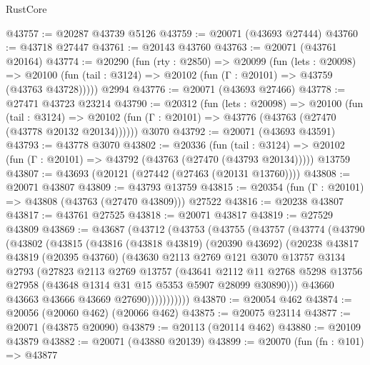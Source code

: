 \begin{lexlean}{RustCore}
\begin{coremodule}
@43757 := @20287 @43739 @5126
@43759 := @20071 (@43693 @27444)
@43760 := @43718 @27447
@43761 := @20143 @43760
@43763 := @20071 (@43761 @20164)
@43774 := @20290
    (fun (rty : @2850) =>
    @20099
      (fun (lets : @20098) =>
      @20100 (fun (tail : @3124) => @20102 (fun (Γ : @20101) => @43759 (@43763 @43728)))))
    @2994
@43776 := @20071 (@43693 @27466)
@43778 := @27471 @43723 @23214
@43790 := @20312
    (fun (lets : @20098) =>
    @20100
      (fun (tail : @3124) =>
      @20102 (fun (Γ : @20101) => @43776 (@43763 (@27470 (@43778 @20132 @20134))))))
    @3070
@43792 := @20071 (@43693 @43591)
@43793 := @43778 @3070
@43802 := @20336
    (fun (tail : @3124) => @20102 (fun (Γ : @20101) => @43792 (@43763 (@27470 (@43793 @20134)))))
    @13759
@43807 := @43693 (@20121 (@27442 (@27463 (@20131 @13760))))
@43808 := @20071 @43807
@43809 := @43793 @13759
@43815 := @20354 (fun (Γ : @20101) => @43808 (@43763 (@27470 @43809))) @27522
@43816 := @20238 @43807
@43817 := @43761 @27525
@43818 := @20071 @43817
@43819 := @27529 @43809
@43869 := @43687
    (@43712
      (@43753
        (@43755
          (@43757
            (@43774
              (@43790
                (@43802
                  (@43815
                    (@43816
                      (@43818 @43819)
                      (@20390 @43692)
                      (@20238
                        @43817
                        @43819
                        (@20395 @43760)
                        (@43630
                          @2113
                          @2769
                          @121
                          @3070
                          @13757
                          @3134
                          @2793
                          (@27823
                            @2113
                            @2769
                            @13757
                            (@43641
                              @2112
                              @11
                              @2768
                              @5298
                              @13756
                              @27958
                              (@43648 @1314 @31 @15 @5353 @5907 @28099 @30890)))
                          @43660
                          @43663
                          @43666
                          @43669
                          @27690)))))))))))
@43870 := @20054 @462
@43874 := @20056 (@20060 @462) (@20066 @462)
@43875 := @20075 @23114
@43877 := @20071 (@43875 @20090)
@43879 := @20113 (@20114 @462)
@43880 := @20109 @43879
@43882 := @20071 (@43880 @20139)
@43899 := @20070
    (fun (fn : @101) =>
    @43877

\end{coremodule}
\end{lexlean}
